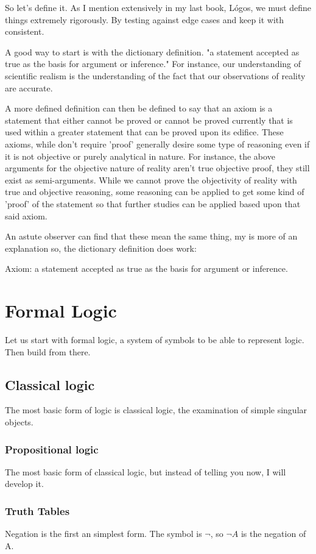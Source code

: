 So let's define it. As I mention extensively in my last book, Lógos, we must define things extremely rigorously. By testing against edge cases and keep it with consistent.

A good way to start is with the dictionary definition. "a statement accepted as true as the basis for argument or inference." For instance, our understanding of scientific realism is the understanding of the fact that our observations of reality are accurate.

A more defined definition can then be defined to say that an axiom is a statement that either cannot be proved or cannot be proved currently that is used within a greater statement that can be proved upon its edifice. These axioms, while don't require 'proof' generally desire some type of reasoning even if it is not objective or purely analytical in nature. For instance, the above arguments for the objective nature of reality aren't true objective proof, they still exist as semi-arguments. While we cannot prove the objectivity of reality with true and objective reasoning, some reasoning can be applied to get some kind of 'proof' of the statement so that further studies can be applied based upon that said axiom.

An astute observer can find that these mean the same thing, my is more of an explanation so, the dictionary definition does work:
\begin{definition}
    Axiom: a statement accepted as true as the basis for argument or inference.
\end{definition}
\section{Formal Logic}
Let us start with formal logic, a system of symbols to be able to represent logic. Then build from there.
\subsection{Classical logic}
The most basic form of logic is classical logic, the examination of simple singular objects.
\subsubsection{Propositional logic}
The most basic form of classical logic, but instead of telling you now, I will develop it.
\subsubsection{Truth Tables}
Negation is the first an simplest form. The symbol is $\neg$, so $\neg A$ is the negation of A.

